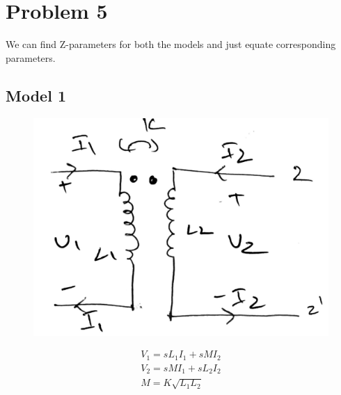\documentclass{article}
\begin{document}
\section*{\hfil Problem 5}
We can find Z-parameters for both the models and just equate corresponding parameters.
\subsection*{Model 1}
\begin{figure}[H]
	\centering
	\includegraphics[scale=0.4]{./figs/5m1.png}
\end{figure}
\begin{gather*}
V_1 = sL_1I_1 + sMI_2\\
V_2 = sMI_1 + sL_2I_2\\
M = K\sqrt{L_1L_2}
\end{gather*}
\end{document}
